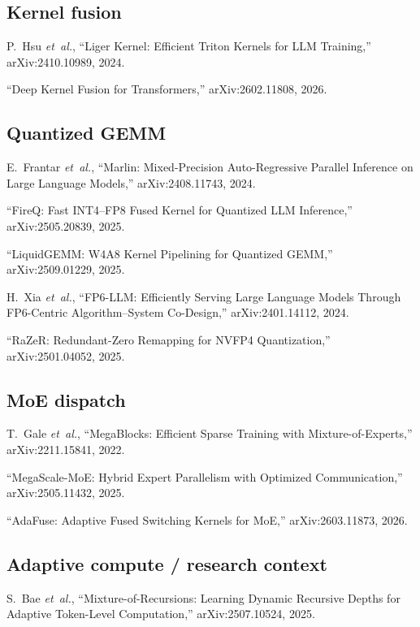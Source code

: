 \documentclass[11pt, letterpaper]{article}
\begin{document}
\subsection*{Kernel fusion}
\begin{enumerate}[resume, label={[\arabic*]}]
\item P.~Hsu \textit{et~al.}, ``Liger Kernel: Efficient Triton Kernels for LLM Training,'' arXiv:2410.10989, 2024.
\item ``Deep Kernel Fusion for Transformers,'' arXiv:2602.11808, 2026.
\end{enumerate}

\subsection*{Quantized GEMM}
\begin{enumerate}[resume, label={[\arabic*]}]
\item E.~Frantar \textit{et~al.}, ``Marlin: Mixed-Precision Auto-Regressive Parallel Inference on Large Language Models,'' arXiv:2408.11743, 2024.
\item ``FireQ: Fast INT4--FP8 Fused Kernel for Quantized LLM Inference,'' arXiv:2505.20839, 2025.
\item ``LiquidGEMM: W4A8 Kernel Pipelining for Quantized GEMM,'' arXiv:2509.01229, 2025.
\item H.~Xia \textit{et~al.}, ``FP6-LLM: Efficiently Serving Large Language Models Through FP6-Centric Algorithm--System Co-Design,'' arXiv:2401.14112, 2024.
\item ``RaZeR: Redundant-Zero Remapping for NVFP4 Quantization,'' arXiv:2501.04052, 2025.
\end{enumerate}

\subsection*{MoE dispatch}
\begin{enumerate}[resume, label={[\arabic*]}]
\item T.~Gale \textit{et~al.}, ``MegaBlocks: Efficient Sparse Training with Mixture-of-Experts,'' arXiv:2211.15841, 2022.
\item ``MegaScale-MoE: Hybrid Expert Parallelism with Optimized Communication,'' arXiv:2505.11432, 2025.
\item ``AdaFuse: Adaptive Fused Switching Kernels for MoE,'' arXiv:2603.11873, 2026.
\end{enumerate}

\subsection*{Adaptive compute / research context}
\begin{enumerate}[resume, label={[\arabic*]}]
\item S.~Bae \textit{et~al.}, ``Mixture-of-Recursions: Learning Dynamic Recursive Depths for Adaptive Token-Level Computation,'' arXiv:2507.10524, 2025.
\end{enumerate}
\end{document}
